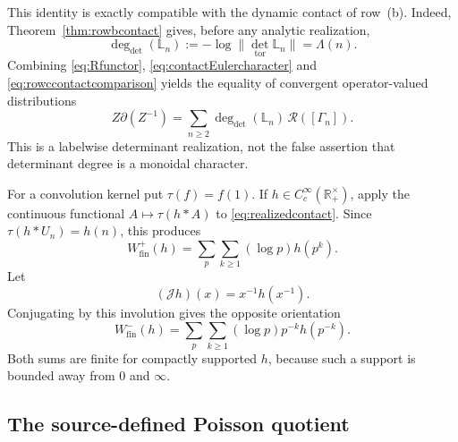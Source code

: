 \documentclass[11pt]{amsart}
\theoremstyle{definition}
\theoremstyle{remark}
\newcommand{\R}{\mathbb R}
\begin{document}
This identity is exactly compatible with the dynamic contact of row~(b).
Indeed, Theorem~\ref{thm:rowbcontact} gives, before any analytic
realization,
\begin{equation}\label{eq:rowccontactcomparison}
 \deg_{\det}(\mathbb L_n)
 :=-\log\|\det_{\mathrm{tor}}\mathbb L_n\|=\Lambda(n).
\end{equation}
Combining \eqref{eq:Rfunctor}, \eqref{eq:contactEulercharacter} and
\eqref{eq:rowccontactcomparison} yields the equality of convergent
operator-valued distributions
\begin{equation}\label{eq:realizedcontact}
 Z\partial(Z^{-1})
 =\sum_{n\geq2}\deg_{\det}(\mathbb L_n)\,
       \mathcal R([\Gamma_n]).
\end{equation}
This is a labelwise determinant realization, not the false assertion that
determinant degree is a monoidal character.

For a convolution kernel put $\tau(f)=f(1)$.  If
$h\in C_c^\infty(\R_+^\times)$, apply the continuous functional
$A\mapsto\tau(h*A)$ to \eqref{eq:realizedcontact}.  Since
$\tau(h*U_n)=h(n)$, this produces
\begin{equation}\label{eq:Wfinplus}
 W_{\mathrm{fin}}^+(h)=
 \sum_p\sum_{k\geq1}(\log p)h(p^k).
\end{equation}
Let
\begin{equation}\label{eq:Janalytic}
 (\mathscr Jh)(x)=x^{-1}h(x^{-1}).
\end{equation}
Conjugating by this involution gives the opposite orientation
\begin{equation}\label{eq:Wfinminus}
 W_{\mathrm{fin}}^-(h)=
 \sum_p\sum_{k\geq1}(\log p)p^{-k}h(p^{-k}).
\end{equation}
Both sums are finite for compactly supported $h$, because such a support is
bounded away from $0$ and $\infty$.

\subsection{The source-defined Poisson quotient}
\end{document}
